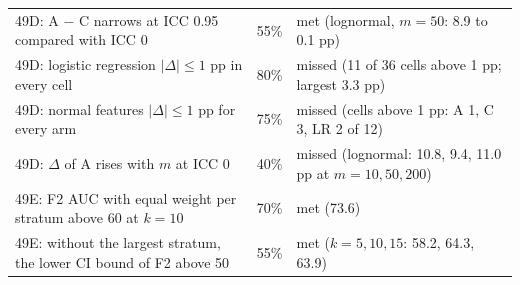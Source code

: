 {\begin{longtable}{p{}cp{}}
49D: A $-$ C narrows at ICC 0.95 compared with ICC 0 & 55\% & met (lognormal, $m = 50$: 8.9 to 0.1 pp) \\
49D: logistic regression $|\Delta| \leq 1$ pp in every cell & 80\% & missed (11 of 36 cells above 1 pp; largest 3.3 pp) \\
49D: normal features $|\Delta| \leq 1$ pp for every arm & 75\% & missed (cells above 1 pp: A 1, C 3, LR 2 of 12) \\
49D: $\Delta$ of A rises with $m$ at ICC 0 & 40\% & missed (lognormal: 10.8, 9.4, 11.0 pp at $m = 10, 50, 200$) \\
49E: F2 AUC with equal weight per stratum above 60 at $k = 10$ & 70\% & met (73.6) \\
49E: without the largest stratum, the lower CI bound of F2 above 50 & 55\% & met ($k = 5, 10, 15$: 58.2, 64.3, 63.9) \\
\end{longtable}
}

